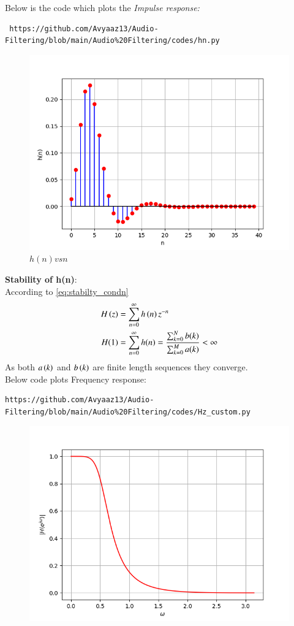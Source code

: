 \documentclass[journal,12pt,twocolumn]{IEEEtran}
\theoremstyle{remark}
\renewcommand\thesection{\arabic{section}}
\numberwithin{equation}{subsection}
\begin{document}
\begin{enumerate}[label=\thesection.\arabic*]
Below is the code which plots the {\em Impulse response:}
\begin{lstlisting}
 https://github.com/Avyaaz13/Audio-Filtering/blob/main/Audio%20Filtering/codes/hn.py
 \end{lstlisting}
% 
\begin{figure}[!ht]
\centering
\includegraphics[width=\columnwidth]{figs/h(n)_custom.png}
\caption{$h(n) vs n$}
\label{fig:hn_custom}
\end{figure}
\textbf{Stability of h(n)}:\\
According to \eqref{eq:stabilty_condn}
\begin{align}
H\left(z\right) &= \sum_{n = 0}^{\infty} h\left(n\right)z^{-n}\\
H(1)&= \sum_{n = 0}^{\infty}h(n)  = \frac{\sum_{k = 0}^{N}b(k)}{\sum_{k = 0}^{M}a(k)}< \infty
\end{align}
As both $a\left(k\right)$ and $b\left(k\right)$ are finite length sequences they converge.\\
Below code plots Frequency response:
\begin{lstlisting}
https://github.com/Avyaaz13/Audio-Filtering/blob/main/Audio%20Filtering/codes/Hz_custom.py
\end{lstlisting}
\begin{figure}[H]
\centering
\includegraphics[width=\columnwidth]{figs/Filter_Response.png}

\end{figure}
\end{enumerate}
\end{document}
